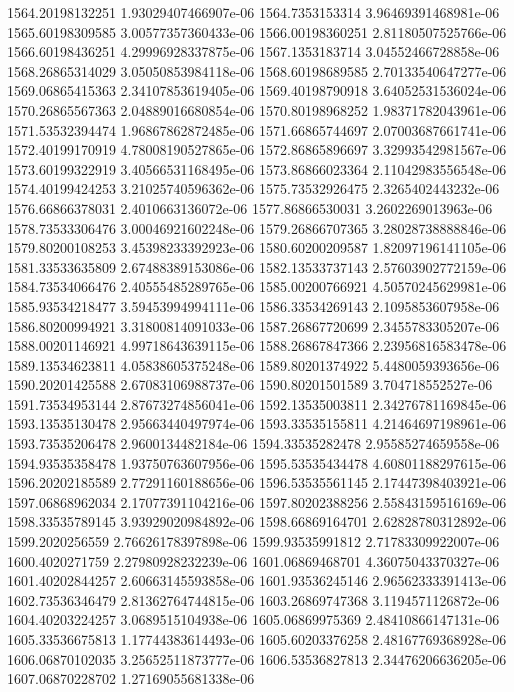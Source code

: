 {1564.20198132251 1.93029407466907e-06
1564.7353153314 3.96469391468981e-06
1565.60198309585 3.00577357360433e-06
1566.00198360251 2.81180507525766e-06
1566.60198436251 4.29996928337875e-06
1567.1353183714 3.04552466728858e-06
1568.26865314029 3.05050853984118e-06
1568.60198689585 2.70133540647277e-06
1569.06865415363 2.34107853619405e-06
1569.40198790918 3.64052531536024e-06
1570.26865567363 2.04889016680854e-06
1570.80198968252 1.98371782043961e-06
1571.53532394474 1.96867862872485e-06
1571.66865744697 2.07003687661741e-06
1572.40199170919 4.78008190527865e-06
1572.86865896697 3.32993542981567e-06
1573.60199322919 3.40566531168495e-06
1573.86866023364 2.11042983556548e-06
1574.40199424253 3.21025740596362e-06
1575.73532926475 2.3265402443232e-06
1576.66866378031 2.4010663136072e-06
1577.86866530031 3.2602269013963e-06
1578.73533306476 3.00046921602248e-06
1579.26866707365 3.28028738888846e-06
1579.80200108253 3.45398233392923e-06
1580.60200209587 1.82097196141105e-06
1581.33533635809 2.67488389153086e-06
1582.13533737143 2.57603902772159e-06
1584.73534066476 2.40555485289765e-06
1585.00200766921 4.50570245629981e-06
1585.93534218477 3.59453994994111e-06
1586.33534269143 2.1095853607958e-06
1586.80200994921 3.31800814091033e-06
1587.26867720699 2.3455783305207e-06
1588.00201146921 4.99718643639115e-06
1588.26867847366 2.23956816583478e-06
1589.13534623811 4.05838605375248e-06
1589.80201374922 5.4480059393656e-06
1590.20201425588 2.67083106988737e-06
1590.80201501589 3.704718552527e-06
1591.73534953144 2.87673274856041e-06
1592.13535003811 2.34276781169845e-06
1593.13535130478 2.95663440497974e-06
1593.33535155811 4.21464697198961e-06
1593.73535206478 2.9600134482184e-06
1594.33535282478 2.95585274659558e-06
1594.93535358478 1.93750763607956e-06
1595.53535434478 4.60801188297615e-06
1596.20202185589 2.77291160188656e-06
1596.53535561145 2.17447398403921e-06
1597.06868962034 2.17077391104216e-06
1597.80202388256 2.55843159516169e-06
1598.33535789145 3.93929020984892e-06
1598.66869164701 2.62828780312892e-06
1599.2020256559 2.76626178397898e-06
1599.93535991812 2.71783309922007e-06
1600.4020271759 2.27980928232239e-06
1601.06869468701 4.36075043370327e-06
1601.40202844257 2.60663145593858e-06
1601.93536245146 2.96562333391413e-06
1602.73536346479 2.81362764744815e-06
1603.26869747368 3.1194571126872e-06
1604.40203224257 3.0689515104938e-06
1605.06869975369 2.48410866147131e-06
1605.33536675813 1.17744383614493e-06
1605.60203376258 2.48167769368928e-06
1606.06870102035 3.25652511873777e-06
1606.53536827813 2.34476206636205e-06
1607.06870228702 1.27169055681338e-06
}
